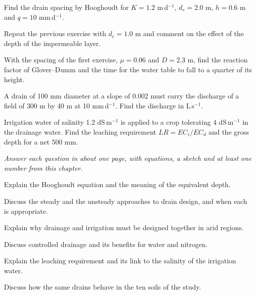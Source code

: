 \begin{exlist}
\item Find the drain spacing by Hooghoudt for $K=1.2$ m\,d$^{-1}$, $d_e=2.0$ m, $h=0.6$ m and $q=10$ mm\,d$^{-1}$.
\item Repeat the previous exercise with $d_e=1.0$ m and comment on the effect of the depth of the impermeable layer.
\item With the spacing of the first exercise, $\mu=0.06$ and $D=2.3$ m, find the reaction factor of Glover--Dumm and the time for the water table to fall to a quarter of its height.
\item A drain of 100 mm diameter at a slope of 0.002 must carry the discharge of a field of 300 m by 40 m at 10 mm\,d$^{-1}$. Find the discharge in L\,s$^{-1}$.
\item Irrigation water of salinity 1.2 dS\,m$^{-1}$ is applied to a crop tolerating 4 dS\,m$^{-1}$ in the drainage water. Find the leaching requirement $LR=EC_i/EC_d$ and the gross depth for a net 500 mm.
\end{exlist}
{\small\itshape Answer each question in about one page, with equations, a sketch and at least one number from this chapter.}\par\vspace{3pt}
\begin{exlist}
\item Explain the Hooghoudt equation and the meaning of the equivalent depth.
\item Discuss the steady and the unsteady approaches to drain design, and when each is appropriate.
\item Explain why drainage and irrigation must be designed together in arid regions.
\item Discuss controlled drainage and its benefits for water and nitrogen.
\item Explain the leaching requirement and its link to the salinity of the irrigation water.
\item Discuss how the same drains behave in the ten soils of the study.
\end{exlist}
